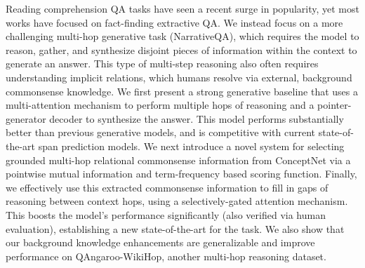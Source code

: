 Reading comprehension QA tasks have seen a recent surge in popularity, yet most works have focused on fact-finding extractive QA. We instead focus on a more challenging multi-hop generative task (NarrativeQA), which requires the model to reason, gather, and synthesize disjoint pieces of information within the context to generate an answer. This type of multi-step reasoning also often requires understanding implicit relations, which humans resolve via external, background commonsense knowledge. We first present a strong generative baseline that uses a multi-attention mechanism to perform multiple hops of reasoning and a pointer-generator decoder to synthesize the answer. This model performs substantially better than previous generative models, and is competitive with current state-of-the-art span prediction models. We next introduce a novel system for selecting grounded multi-hop relational commonsense information from ConceptNet via a pointwise mutual information and term-frequency based scoring function. Finally, we effectively use this extracted commonsense information to fill in gaps of reasoning between context hops, using a selectively-gated attention mechanism. This boosts the model's performance significantly (also verified via human evaluation), establishing a new state-of-the-art for the task. We also show that our background knowledge enhancements are generalizable and improve performance on QAngaroo-WikiHop, another multi-hop reasoning dataset.
